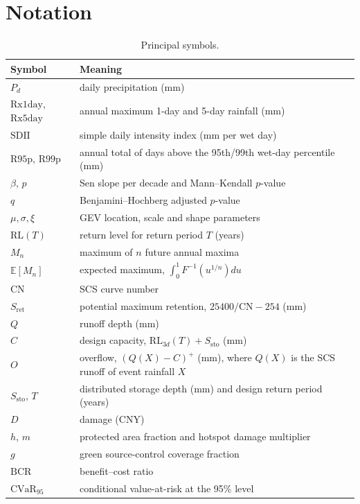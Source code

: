 \section{Notation}\label{app:notation}

\begin{table}[H]
\centering
\caption{Principal symbols.}
\label{tab:notation}
\small
\begin{tabular}{ll}
\toprule
Symbol & Meaning\\
\midrule
$P_d$ & daily precipitation (mm)\\
$\mathrm{Rx1day}$, $\mathrm{Rx5day}$ & annual maximum 1-day and 5-day rainfall (mm)\\
$\mathrm{SDII}$ & simple daily intensity index (mm per wet day)\\
$\mathrm{R95p}$, $\mathrm{R99p}$ & annual total of days above the 95th/99th wet-day percentile (mm)\\
$\beta$, $p$ & Sen slope per decade and Mann--Kendall $p$-value\\
$q$ & Benjamini--Hochberg adjusted $p$-value\\
$\mu,\sigma,\xi$ & GEV location, scale and shape parameters\\
$\mathrm{RL}(T)$ & return level for return period $T$ (years)\\
$M_n$ & maximum of $n$ future annual maxima\\
$\mathbb{E}[M_n]$ & expected maximum, $\int_0^1F^{-1}(u^{1/n})du$\\
$\mathrm{CN}$ & SCS curve number\\
$S_{\text{ret}}$ & potential maximum retention, $25400/\mathrm{CN}-254$ (mm)\\
$Q$ & runoff depth (mm)\\
$C$ & design capacity, $\mathrm{RL}_{3d}(T)+S_{\text{sto}}$ (mm)\\
$O$ & overflow, $(Q(X)-C)^+$ (mm), where $Q(X)$ is the SCS runoff of event rainfall $X$\\
$S_{\text{sto}}$, $T$ & distributed storage depth (mm) and design return period (years)\\
$D$ & damage (CNY)\\
$h$, $m$ & protected area fraction and hotspot damage multiplier\\
$g$ & green source-control coverage fraction\\
$\mathrm{BCR}$ & benefit--cost ratio\\
$\mathrm{CVaR}_{95}$ & conditional value-at-risk at the 95\% level\\
\bottomrule
\end{tabular}
\end{table}

